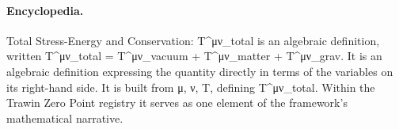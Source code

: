 \paragraph{Encyclopedia.}
Total Stress-Energy and Conservation: T\textasciicircum{}μν\_total is an algebraic definition, written T\textasciicircum{}μν\_total = T\textasciicircum{}μν\_vacuum + T\textasciicircum{}μν\_matter + T\textasciicircum{}μν\_grav. It is an algebraic definition expressing the quantity directly in terms of the variables on its right-hand side. It is built from μ, ν, T, defining T\textasciicircum{}μν\_total. Within the Trawin Zero Point registry it serves as one element of the framework's mathematical narrative.
